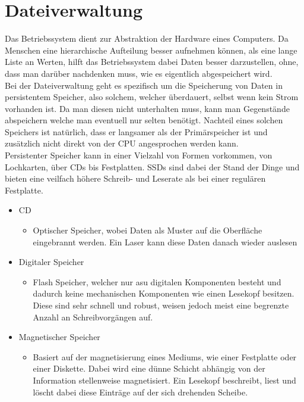 \documentclass{article}
\begin{document}
	\section{Dateiverwaltung}
	Das Betriebssystem dient zur Abstraktion der Hardware eines Computers. Da Menschen eine hierarchische Aufteilung besser aufnehmen können, als eine lange Liste an Werten, hilft das Betriebssystem dabei Daten besser darzustellen, ohne, dass man darüber nachdenken muss, wie es eigentlich abgespeichert wird. \\
	Bei der Dateiverwaltung geht es spezifisch um die Speicherung von Daten in persistentem Speicher, also solchem, welcher überdauert, selbst wenn kein Strom vorhanden ist. Da man diesen nicht unterhalten muss, kann man Gegenstände abspeichern welche man eventuell nur selten benötigt. Nachteil eines solchen Speichers ist natürlich, dass er langsamer als der Primärspeicher ist und zusätzlich nicht direkt von der CPU angesprochen werden kann. \\
	Persistenter Speicher kann in einer Vielzahl von Formen vorkommen, von Lochkarten, über CDs bis Festplatten. SSDs sind dabei der Stand der Dinge und bieten eine veilfach höhere Schreib- und Leserate als bei einer regulären Festplatte. \\
	\begin{itemize}
		\item{CD}
		\begin{itemize}
			\item{Optischer Speicher, wobei Daten als Muster auf die Oberfläche eingebrannt werden. Ein Laser kann diese Daten danach wieder auslesen}
		\end{itemize}
		\item{Digitaler Speicher}
		\begin{itemize}
			\item{Flash Speicher, welcher nur asu digitalen Komponenten besteht und dadurch keine mechanischen Komponenten wie einen Lesekopf besitzen. Diese sind sehr schnell und robust, weisen jedoch meist eine begrenzte Anzahl an Schreibvorgängen auf.}
		\end{itemize}
		\item{Magnetischer Speicher}
		\begin{itemize}
			\item{Basiert auf der magnetisierung eines Mediums, wie einer Festplatte oder einer Diskette. Dabei wird eine dünne Schicht abhängig von der Information stellenweise magnetisiert. Ein Lesekopf beschreibt, liest und löscht dabei diese Einträge auf der sich drehenden Scheibe.}
		\end{itemize}
	\end{itemize}
\end{document}
